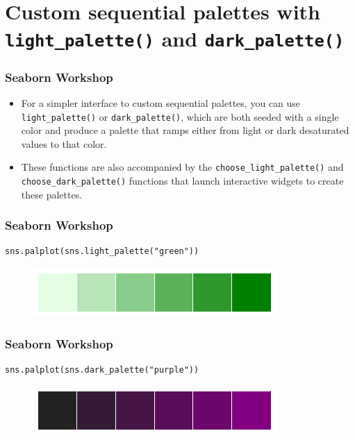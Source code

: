 \documentclass{beamer}
\begin{document}
\section{Custom sequential palettes with \texttt{light\_palette()} and \texttt{dark\_palette()}}
\begin{frame}[fragile]
	\frametitle{Seaborn Workshop}
	\large
\begin{itemize}
\item For a simpler interface to custom sequential palettes, you can use \texttt{light\_palette()} or \texttt{dark\_palette()}, which are both seeded with a single color and produce a palette that ramps either from light or dark desaturated values to that color. 
\item These functions are also accompanied by the \texttt{choose\_light\_palette()} and \texttt{choose\_dark\_palette()} functions that launch interactive widgets to create these palettes.
\end{itemize}

\end{frame}
\begin{frame}[fragile]
	\frametitle{Seaborn Workshop}
	\large
	\begin{verbatim}
sns.palplot(sns.light_palette("green"))
	\end{verbatim}

\begin{figure}
\centering
\includegraphics[width=0.7\linewidth]{images/color_palettes_43_0}
\caption{}
\label{fig:color_palettes_43_0}
\end{figure}

\end{frame}
\begin{frame}[fragile]
	\frametitle{Seaborn Workshop}
	\large
\begin{verbatim}
sns.palplot(sns.dark_palette("purple"))
\end{verbatim}	


\begin{figure}
\centering
\includegraphics[width=0.7\linewidth]{images/color_palettes_44_0}
\caption{}
\label{fig:color_palettes_44_0}
\end{figure}

\end{frame}
\end{document}
